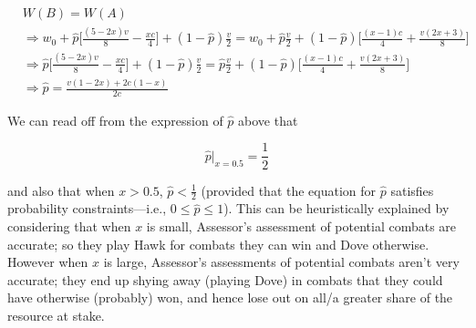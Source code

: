 \documentclass{article}
\begin{document}
\begin{align*}
    &W(B) = W(A) \\
    &\Rightarrow
        w_0 + \hat{p} \Big[\frac{(5 - 2 x) v}{8} - \frac{x c}{4}\Big]
        + (1 - \hat{p}) \frac{v}{2}
        =
        w_0 + \hat{p} \frac{v}{2}
        + (1 - \hat{p}) \Big[\frac{(x - 1) c}{4} + \frac{v (2 x + 3)}{8}\Big] \\
    &\Rightarrow
        \hat{p} \Big[\frac{(5 - 2 x) v}{8} - \frac{x c}{4}\Big]
        + (1 - \hat{p}) \frac{v}{2}
        =
        \hat{p} \frac{v}{2}
        + (1 - \hat{p}) \Big[\frac{(x - 1) c}{4} + \frac{v (2 x + 3)}{8}\Big] \\
    &\Rightarrow \hat{p} = \frac{v (1 - 2 x) + 2 c (1 - x)}{2 c}
\end{align*}

We can read off from the expression of $\hat{p}$ above that

\begin{equation*}
    \hat{p}\bigr|_{x=0.5} = \frac{1}{2}
\end{equation*}

and also that when $x > 0.5$, $\hat{p} < \frac{1}{2}$ (provided that the
equation for $\hat{p}$ satisfies probability constraints---i.e., $0 \leq
\hat{p} \leq 1$). This can be heuristically explained by considering
that when $x$ is small, Assessor's assessment of potential combats are
accurate; so they play Hawk for combats they can win and Dove otherwise.
However when $x$ is large, Assessor's assessments of potential combats
aren't very accurate; they end up shying away (playing Dove) in combats
that they could have otherwise (probably) won, and hence lose out on
all/a greater share of the resource at stake.
\end{document}
